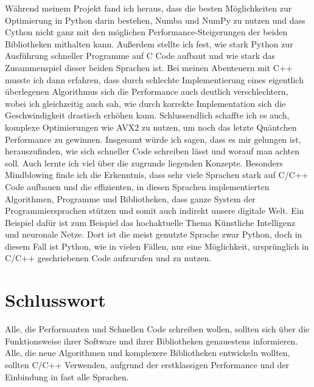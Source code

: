 \documentclass[11pt,a4paper]{article}
\begin{document}
Während meinem Projekt fand ich heraus, dass die besten Möglichkeiten zur Optimierung in Python darin bestehen,
Numba und NumPy zu nutzen und dass Cython nicht ganz mit den möglichen Performance-Steigerungen der beiden Bibliotheken mithalten kann.
Außerdem stellte ich fest, wie stark Python zur Ausführung schneller Programme auf C Code aufbaut und wie stark das Zusammenspiel dieser
beiden Sprachen ist.
Bei meinen Abenteuern mit C++ musste ich dann erfahren, dass durch schlechte Implementierung eines eigentlich überlegenen Algorithmus sich die
Performance auch deutlich verschlechtern, wobei ich gleichzeitig auch sah, wie durch korrekte Implementation sich die Geschwindigkeit drastisch
erhöhen kann. Schlussendlich schaffte ich es auch, komplexe Optimierungen wie AVX2 zu nutzen, um noch das letzte Quäntchen Performance zu gewinnen.
Insgesamt würde ich sagen, dass es mir gelungen ist, herauszufinden, wie sich schneller Code schreiben lässt und worauf man achten soll.
Auch lernte ich viel über die zugrunde liegenden Konzepte.
Besonders Mindblowing finde ich die Erkenntnis, dass sehr viele Sprachen stark auf C/C++ Code aufbauen
und die effizienten, in diesen Sprachen implementierten Algorithmen, Programme und Bibliotheken, dass ganze System
der Programmiersprachen stützen und somit auch indirekt unsere digitale Welt.
Ein Beispiel dafür ist zum Beispiel das hochaktuelle Thema Künstliche Intelligenz und neuronale Netze.
Dort ist die meist genutzte Sprache zwar Python, doch in diesem Fall ist Python, wie in vielen Fällen, nur
eine Möglichkeit, ursprünglich in C/C++ geschriebenen Code aufzurufen und zu nutzen.

\section{Schlusswort}

Alle, die Performanten und Schnellen Code schreiben wollen, sollten sich über die Funktionsweise ihrer 
Software und ihrer Bibliotheken genauestens informieren.
Alle, die neue Algorithmen und komplexere Bibliotheken entwickeln wollten, sollten C/C++
Verwenden, aufgrund der erstklassigen Performance und der Einbindung in fast alle Sprachen.

\clearpage

\printbibliography[title={Literaturverzeichnis}]
\end{document}
